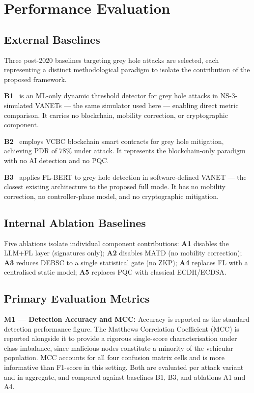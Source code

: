 \documentclass[12pt, a4paper]{report}
\begin{document}
\section{Performance Evaluation}
\label{sec:evaluation}

\subsection{External Baselines}

Three post-2020 baselines targeting grey hole attacks are selected,
each representing a distinct methodological paradigm to isolate
the contribution of the proposed framework.

\textbf{B1}~\cite{malik2023greyhole} is an ML-only dynamic threshold
detector for grey hole attacks in NS-3-simulated VANETs — the same
simulator used here — enabling direct metric comparison. It carries
no blockchain, mobility correction, or cryptographic component.

\textbf{B2}~\cite{alabdulatif2024mitigating} employs VCBC blockchain
smart contracts for grey hole mitigation, achieving PDR of 78\% under
attack. It represents the blockchain-only paradigm with no AI detection
and no PQC.

\textbf{B3}~\cite{ahsan2024flbert} applies FL-BERT to grey hole detection
in software-defined VANET — the closest existing architecture to the
proposed full mode. It has no mobility correction, no controller-plane
model, and no cryptographic mitigation.

\subsection{Internal Ablation Baselines}

Five ablations isolate individual component contributions:
\textbf{A1} disables the LLM+FL layer (signatures only);
\textbf{A2} disables MATD (no mobility correction);
\textbf{A3} reduces DEBSC to a single statistical gate (no ZKP);
\textbf{A4} replaces FL with a centralised static model;
\textbf{A5} replaces PQC with classical ECDH/ECDSA.

\subsection{Primary Evaluation Metrics}

\textbf{M1 — Detection Accuracy and MCC:} Accuracy is reported as the
standard detection performance figure. The Matthews Correlation Coefficient
(MCC) is reported alongside it to provide a rigorous single-score
characterisation under class imbalance, since malicious nodes constitute
a minority of the vehicular population. MCC accounts for all four
confusion matrix cells and is more informative than F1-score in this
setting. Both are evaluated per attack variant and in aggregate, and
compared against baselines B1, B3, and ablations A1 and A4.
\end{document}
